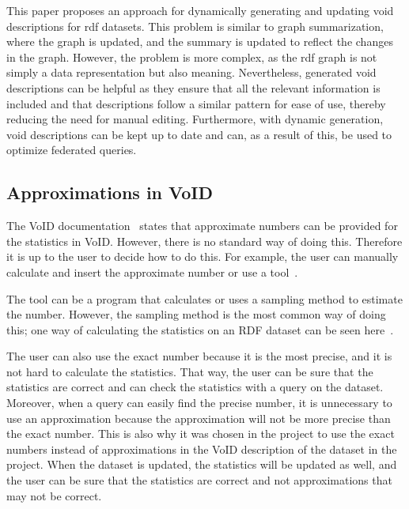 This paper proposes an approach for dynamically generating and updating \gls{void} descriptions for \gls{rdf} datasets. This problem is similar to graph summarization, where the graph is updated, and the summary is updated to reflect the changes in the graph. However, the problem is more complex, as the \gls{rdf} graph is not simply a data representation but also meaning. Nevertheless, generated \gls{void} descriptions can be helpful as they ensure that all the relevant information is included and that descriptions follow a similar pattern for ease of use, thereby reducing the need for manual editing. Furthermore, with dynamic generation, \gls{void} descriptions can be kept up to date and can, as a result of this, be used to optimize federated queries.

\subsection{Approximations in VoID} \label{sec:approximations}
The VoID documentation~\cite{documentation-void} states that approximate numbers can be provided for the statistics in VoID.
However, there is no standard way of doing this. Therefore it is up to the user to decide how to do this. For example, the user can manually calculate and insert the approximate number or use a tool~\cite{the-web-of-data}.

The tool can be a program that calculates or uses a sampling method to estimate the number. However, the sampling method is the most common way of doing this; one way of calculating the statistics on an RDF dataset can be seen here~\cite{zneika2016rdf}.

The user can also use the exact number because it is the most precise, and it is not hard to calculate the statistics. That way, the user can be sure that the statistics are correct and can check the statistics with a query on the dataset. Moreover, when a query can easily find the precise number, it is unnecessary to use an approximation because the approximation will not be more precise than the exact number.
This is also why it was chosen in the project to use the exact numbers instead of approximations in the  VoID description of the dataset in the project. When the dataset is updated, the statistics will be updated as well, and the user can be sure that the statistics are correct and not approximations that may not be correct.



